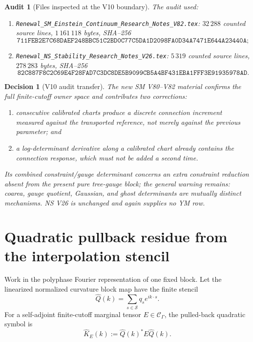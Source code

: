 \documentclass[11pt,oneside]{book}
\newtheorem{audit}[theorem]{Audit}
\newtheorem{decision}[theorem]{Decision}
\theoremstyle{definition}
\theoremstyle{remark}
\begin{document}
\begin{audit}[Files inspected at the V10 boundary]
\label{aud:e8v10-files}
The audit used:
\begin{enumerate}[label=\textup{(\roman*)},leftmargin=3.5em]
\item
\texttt{Renewal\_SM\_Einstein\_Continuum\_Research\_Notes\_V82.tex}:
\(32\,288\) counted source lines, \(1\,161\,118\) bytes, SHA--256
\[
\texttt{711FEB2E7C68DAEF248BBC51C2BD0C77C5DA1D2098FA0D34A7471E644A23440A};
\]
\item
\texttt{Renewal\_NS\_Stability\_Research\_Notes\_V26.tex}:
\(5\,319\) counted source lines, \(278\,283\) bytes, SHA--256
\[
\texttt{82C887F8C2C69E4F28FAD7C3DC8DE5B9099CB5A4BF431EBA1FFF3E91935978AD}.
\]
\end{enumerate}
\end{audit}

\begin{decision}[V10 audit transfer]
\label{dec:e8v10-transfer}
The new SM V80--V82 material confirms the full finite-cutoff owner
space and contributes two corrections:
\begin{enumerate}[label=\textup{(\alph*)},leftmargin=3.5em]
\item consecutive calibrated charts produce a discrete connection
      increment measured against the \emph{transported} reference,
      not merely against the previous parameter; and
\item a log-determinant derivative along a calibrated chart already
      contains the connection response, which must not be added a
      second time.
\end{enumerate}
Its combined constraint/gauge determinant concerns an extra
constraint reduction absent from the present pure tree-gauge block;
the general warning remains: coarea, gauge quotient, Gaussian, and
ghost determinants are mutually distinct mechanisms.  NS V26 is
unchanged and again supplies no YM row.
\end{decision}

\section{Quadratic pullback residue from the interpolation stencil}
\label{sec:e8v10-symbol}

Work in the polyphase Fourier representation of one fixed block.  Let
the linearized normalized curvature block map have the finite stencil
\[
 \widehat Q(k)=\sum_{s\in{\mathcal S}}q_s e^{ik\cdot s}.             \label{eq:e8v10-Q}
\]
For a self-adjoint finite-cutoff marginal tensor
\(E\in{\mathcal C}_\Gamma\), the pulled-back quadratic symbol is
\[
 \widehat K_E(k):=\widehat Q(k)^*E\widehat Q(k).      \label{eq:e8v10-KE}
\]
\end{document}
